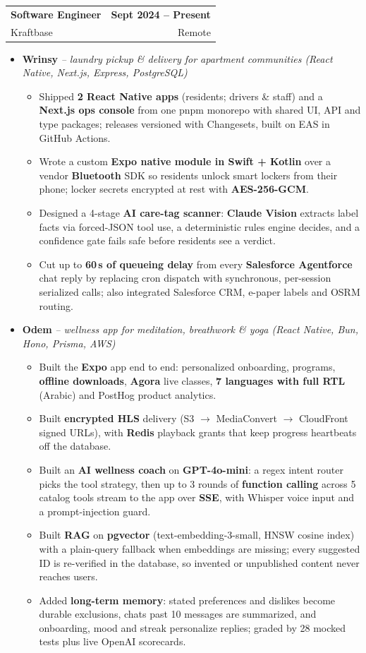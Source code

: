 \documentclass[a4paper,10pt]{article}
\makeatletter
\newcommand{\resumeItem}[1]{\item\small{#1\vspace{-2pt}}}
\newcommand{\resumeRole}[4]{
  \vspace{-1pt}\item
  \begin{tabular*}{\textwidth}[t]{l@{\extracolsep{\fill}}r}
    \textbf{#1} & \small\textbf{#2} \\
    \small{#3} & \small{#4} \\
  \end{tabular*}\vspace{-6pt}
}
\newcommand{\resumeProduct}[2]{
  \item[]\vspace{-2pt}\small{\textbf{#1} \textit{-- #2}}\vspace{-4pt}
}
\newcommand{\resumeListStart}{\begin{itemize}[leftmargin=0.15in, label={}]}
\newcommand{\resumeListEnd}{\end{itemize}}
\newcommand{\resumeItemsStart}{\begin{itemize}[leftmargin=0.2in, itemsep=0pt, label=\textbullet]}
\newcommand{\resumeItemsEnd}{\end{itemize}\vspace{-4pt}}
\makeatother
\begin{document}
  \resumeRole{Software Engineer}{Sept 2024 -- Present}{Kraftbase}{Remote}
  \resumeListStart
    \resumeProduct{Wrinsy}{laundry pickup \& delivery for apartment communities (React Native, Next.js, Express, PostgreSQL)}
    \resumeItemsStart
      \resumeItem{Shipped \textbf{2 React Native apps} (residents; drivers \& staff) and a \textbf{Next.js ops console} from one pnpm monorepo with shared UI, API and type packages; releases versioned with Changesets, built on EAS in GitHub Actions.}
      \resumeItem{Wrote a custom \textbf{Expo native module in Swift + Kotlin} over a vendor \textbf{Bluetooth} SDK so residents unlock smart lockers from their phone; locker secrets encrypted at rest with \textbf{AES-256-GCM}.}
      \resumeItem{Designed a 4-stage \textbf{AI care-tag scanner}: \textbf{Claude Vision} extracts label facts via forced-JSON tool use, a deterministic rules engine decides, and a confidence gate fails safe before residents see a verdict.}
      \resumeItem{Cut up to \textbf{60\,s of queueing delay} from every \textbf{Salesforce Agentforce} chat reply by replacing cron dispatch with synchronous, per-session serialized calls; also integrated Salesforce CRM, e-paper labels and OSRM routing.}
    \resumeItemsEnd

    \resumeProduct{Odem}{wellness app for meditation, breathwork \& yoga (React Native, Bun, Hono, Prisma, AWS)}
    \resumeItemsStart
      \resumeItem{Built the \textbf{Expo} app end to end: personalized onboarding, programs, \textbf{offline downloads}, \textbf{Agora} live classes, \textbf{7 languages with full RTL} (Arabic) and PostHog product analytics.}
      \resumeItem{Built \textbf{encrypted HLS} delivery (S3 $\rightarrow$ MediaConvert $\rightarrow$ CloudFront signed URLs), with \textbf{Redis} playback grants that keep progress heartbeats off the database.}
      \resumeItem{Built an \textbf{AI wellness coach} on \textbf{GPT-4o-mini}: a regex intent router picks the tool strategy, then up to 3 rounds of \textbf{function calling} across 5 catalog tools stream to the app over \textbf{SSE}, with Whisper voice input and a prompt-injection guard.}
      \resumeItem{Built \textbf{RAG} on \textbf{pgvector} (text-embedding-3-small, HNSW cosine index) with a plain-query fallback when embeddings are missing; every suggested ID is re-verified in the database, so invented or unpublished content never reaches users.}
      \resumeItem{Added \textbf{long-term memory}: stated preferences and dislikes become durable exclusions, chats past 10 messages are summarized, and onboarding, mood and streak personalize replies; graded by 28 mocked tests plus live OpenAI scorecards.}
    \resumeItemsEnd
  \resumeListEnd
\end{document}
